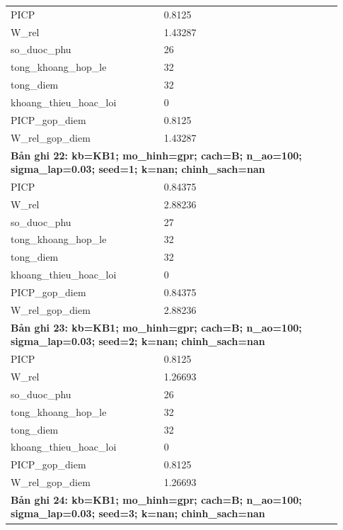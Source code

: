 \begin{longtable}{p{0.43\linewidth}p{0.50\linewidth}}
PICP & 0.8125 \\
W\_\allowbreak rel & 1.43287 \\
so\_\allowbreak duoc\_\allowbreak phu & 26 \\
tong\_\allowbreak khoang\_\allowbreak hop\_\allowbreak le & 32 \\
tong\_\allowbreak diem & 32 \\
khoang\_\allowbreak thieu\_\allowbreak hoac\_\allowbreak loi & 0 \\
PICP\_\allowbreak gop\_\allowbreak diem & 0.8125 \\
W\_\allowbreak rel\_\allowbreak gop\_\allowbreak diem & 1.43287 \\
\midrule
\multicolumn{2}{p{0.95\linewidth}}{\textbf{Bản ghi 22: kb=KB1; mo\_hinh=gpr; cach=B; n\_ao=100; sigma\_lap=0.03; seed=1; k=nan; chinh\_sach=nan}} \\
PICP & 0.84375 \\
W\_\allowbreak rel & 2.88236 \\
so\_\allowbreak duoc\_\allowbreak phu & 27 \\
tong\_\allowbreak khoang\_\allowbreak hop\_\allowbreak le & 32 \\
tong\_\allowbreak diem & 32 \\
khoang\_\allowbreak thieu\_\allowbreak hoac\_\allowbreak loi & 0 \\
PICP\_\allowbreak gop\_\allowbreak diem & 0.84375 \\
W\_\allowbreak rel\_\allowbreak gop\_\allowbreak diem & 2.88236 \\
\midrule
\multicolumn{2}{p{0.95\linewidth}}{\textbf{Bản ghi 23: kb=KB1; mo\_hinh=gpr; cach=B; n\_ao=100; sigma\_lap=0.03; seed=2; k=nan; chinh\_sach=nan}} \\
PICP & 0.8125 \\
W\_\allowbreak rel & 1.26693 \\
so\_\allowbreak duoc\_\allowbreak phu & 26 \\
tong\_\allowbreak khoang\_\allowbreak hop\_\allowbreak le & 32 \\
tong\_\allowbreak diem & 32 \\
khoang\_\allowbreak thieu\_\allowbreak hoac\_\allowbreak loi & 0 \\
PICP\_\allowbreak gop\_\allowbreak diem & 0.8125 \\
W\_\allowbreak rel\_\allowbreak gop\_\allowbreak diem & 1.26693 \\
\midrule
\multicolumn{2}{p{0.95\linewidth}}{\textbf{Bản ghi 24: kb=KB1; mo\_hinh=gpr; cach=B; n\_ao=100; sigma\_lap=0.03; seed=3; k=nan; chinh\_sach=nan}} \\

\end{longtable}
